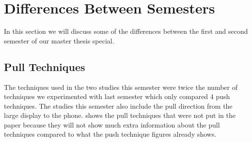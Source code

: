 \section*{Differences Between Semesters} \label{sec:experiments}
In this section we will discuss some of the differences between the first and second semester of our master thesis special. 

\subsection*{Pull Techniques}
The techniques used in the two studies this semester were twice the number of techniques we experimented with last semester which only compared 4 push techniques.
The studies this semester also include the pull direction from the large display to the phone.
 shows the pull techniques that were not put in the paper because they will not show much extra information about the pull techniques compared to what the push technique figures already shows.


